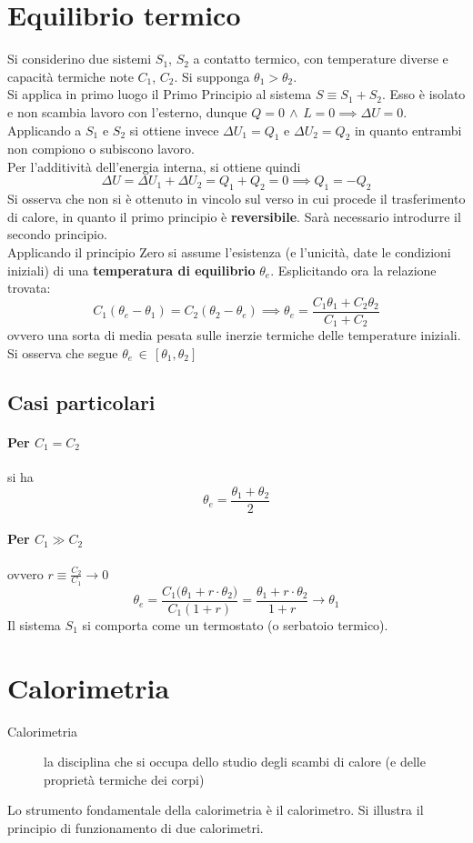 \documentclass[10pt, oneside]{book}
\newcommand{\ds}{\displaystyle}
\begin{document}
\section{Equilibrio termico}
Si considerino due sistemi $S_1$, $S_2$ a contatto termico, con temperature diverse e capacità termiche note $C_1$, $C_2$. Si supponga $\theta_1 > \theta_2$.\\
Si applica in primo luogo il Primo Principio al sistema $S \equiv S_1 + S_2$. Esso è isolato e non scambia lavoro con l'esterno, dunque $\ds Q = 0 \, \land \, L = 0 \implies \Delta U = 0$.\\
Applicando a $S_1$ e $S_2$ si ottiene invece $\Delta U_1 = Q_1$ e $\Delta U_2 = Q_2$ in quanto entrambi non compiono o subiscono lavoro. \\
Per l'additività dell'energia interna, si ottiene quindi 
\[\Delta U = \Delta U_1 + \Delta U_2 = Q_1 + Q_2 = 0 \implies Q_1 = - Q_2\]
Si osserva che non si è ottenuto in vincolo sul verso in cui procede il trasferimento di calore, in quanto il primo principio è \textbf{reversibile}. Sarà necessario introdurre il secondo principio.\\
Applicando il principio Zero si assume l'esistenza (e l'unicità, date le condizioni iniziali) di una \textbf{temperatura di equilibrio} $\theta_e$. Esplicitando ora la relazione trovata:
\[C_1 (\theta_e - \theta_1) = C_2 (\theta_2 - \theta_e) \implies \theta_e = \frac{C_1 \theta_1 + C_2 \theta_2}{C_1 + C_2}\]
ovvero una sorta di media pesata sulle inerzie termiche delle temperature iniziali. Si osserva che segue $\theta_e \, \in \, [\theta_1, \theta_2]$
\subsection{Casi particolari}
\paragraph{Per $C_1 = C_2$} si ha
\[\theta_e = \frac{\theta_1 + \theta_2}{2}\]
\paragraph{Per $C_1 \gg C_2$} ovvero $\ds r \equiv \frac{C_2}{C_1} \rightarrow 0$
\[\theta_e = \frac{C_1 \big(\theta_1 + r \cdot \theta_2\big)}{C_1 (1 + r)} = \frac{\theta_1 + r \cdot \theta_2}{1 + r} \longrightarrow \theta_1\]
Il sistema $S_1$ si comporta come un termostato (o serbatoio termico). 

\section{Calorimetria}
\begin{description}
\item[Calorimetria] la disciplina che si occupa dello studio degli scambi di calore (e delle proprietà termiche dei corpi)
\end{description}
Lo strumento fondamentale della calorimetria è il calorimetro. Si illustra il principio di funzionamento di due calorimetri.
\end{document}
